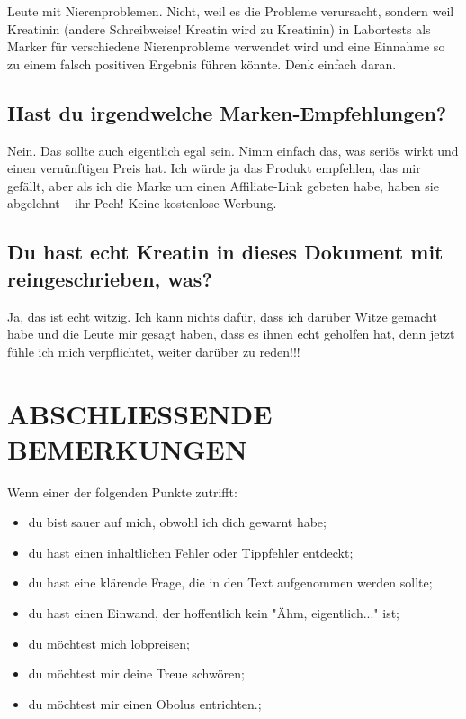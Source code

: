 \documentclass{article}
\begin{document}
Leute mit Nierenproblemen. Nicht, weil es die Probleme verursacht, sondern weil Kreatinin (andere Schreibweise! Kreatin wird zu Kreatinin) in Labortests als Marker für verschiedene Nierenprobleme verwendet wird und eine Einnahme so zu einem falsch positiven Ergebnis führen könnte. Denk einfach daran.

\subsection{Hast du irgendwelche Marken-Empfehlungen?}

Nein. Das sollte auch eigentlich egal sein. Nimm einfach das, was seriös wirkt und einen vernünftigen Preis hat. Ich würde ja das Produkt empfehlen, das mir gefällt, aber als ich die Marke um einen Affiliate-Link gebeten habe, haben sie abgelehnt – ihr Pech! Keine kostenlose Werbung.

\subsection{Du hast echt Kreatin in dieses Dokument mit reingeschrieben, was?}

Ja, das ist echt witzig. Ich kann nichts dafür, dass ich darüber Witze gemacht habe und die Leute mir gesagt haben, dass es ihnen echt geholfen hat, denn jetzt fühle ich mich verpflichtet, weiter darüber zu reden!!!

\section{ABSCHLIESSENDE BEMERKUNGEN}

Wenn einer der folgenden Punkte zutrifft:

\begin{itemize}
\item du bist sauer auf mich, obwohl ich dich gewarnt habe;

\item du hast einen inhaltlichen Fehler oder Tippfehler entdeckt;

\item du hast eine klärende Frage, die in den Text aufgenommen werden sollte;

\item du hast einen Einwand, der hoffentlich kein "Ähm, eigentlich..." ist;

\item du möchtest mich lobpreisen;

\item du möchtest mir deine Treue schwören; 

\item du möchtest mir einen Obolus entrichten.;
\end{itemize}
\end{document}
